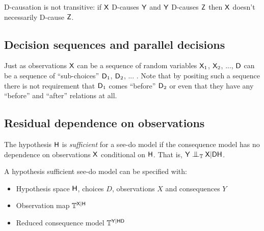D-causation is not transitive: if $\mathsf{X}$ D-causes $\mathsf{Y}$ and $\mathsf{Y}$ D-causes $\mathsf{Z}$ then $\mathsf{X}$ doesn't necessarily D-cause $\mathsf{Z}$.



\subsection{Decision sequences and parallel decisions}

Just as observations $\mathsf{X}$ can be a sequence of random variables $\mathsf{X}_1$, $\mathsf{X}_2$, ..., $\mathsf{D}$ can be a sequence of ``sub-choices'' $\mathsf{D}_1$, $\mathsf{D}_2$, ... . Note that by positing such a sequence there is not requirement that $\mathsf{D}_1$ comes ``before'' $\mathsf{D}_2$ or even that they have any ``before'' and ``after'' relations at all.


\subsection{Residual dependence on observations}

\begin{definition}\label{def:hypothesis_sufficiency}
The hypothesis $\mathsf{H}$ is \emph{sufficient} for a see-do model if the consequence model has no dependence on observations $\mathsf{X}$ conditional on $\mathsf{H}$. That is, $\RV{Y}\CI_\kernel{T} \RV{X}|\RV{D}\RV{H}$. 

A hypothesis sufficient see-do model can be specified with:

\begin{itemize}
    \item Hypothesis space $\mathsf{H}$, choices $D$, observations $X$ and consequences $Y$
    \item Observation map $\mathbb{T}^{\mathsf{X}|\mathsf{H}}$
    \item Reduced consequence model $\mathbb{T}^{\mathsf{Y}|\mathsf{H}\mathsf{D}}$
\end{itemize}
\end{definition}

